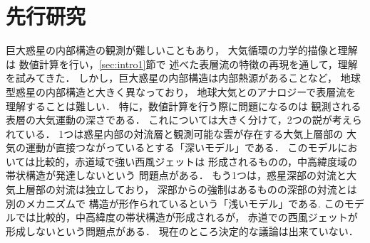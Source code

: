 \documentclass[a4j,12pt,openbib,oneside]{jreport}
\begin{document}
\section{先行研究}
\label{sec:intro2}
巨大惑星の内部構造の観測が難しいこともあり，
大気循環の力学的描像と理解は
数値計算を行い，\ref{sec:intro1}節で
述べた表層流の特徴の再現を通して，理解を試みてきた．
%
しかし，巨大惑星の内部構造は内部熱源があることなど，
地球型惑星の内部構造と大きく異なっており，
地球大気とのアナロジーで表層流を理解することは難しい．
特に，数値計算を行う際に問題になるのは
観測される表層の大気運動の深さである．
これについては大きく分けて，2つの説が考えられている．
%
1つは惑星内部の対流層と観測可能な雲が存在する大気上層部の
大気の運動が直接つながっているとする「深いモデル」である．
このモデルにおいては比較的，赤道域で強い西風ジェットは
形成されるものの，中高緯度域の帯状構造が発達しないという
問題点がある\citep{CHRISTENSEN2002}．
%
もう1つは，惑星深部の対流と大気上層部の対流は独立しており，
深部からの強制はあるものの深部の対流とは別のメカニズムで
構造が形作られているという「浅いモデル」である.
このモデルでは比較的，中高緯度の帯状構造が形成されるが，
赤道での西風ジェットが形成しないという問題点がある\citep{Scott2007}．
%
現在のところ決定的な議論は出来ていない．
%
\end{document}
